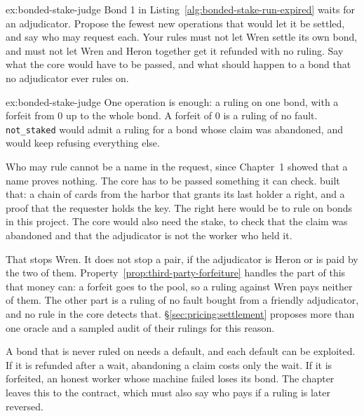 \documentclass[11pt,a4paper]{article}
\theoremstyle{definition}
\theoremstyle{remark}
\begin{document}
\begin{pdexercise}[kind=Open,rating=3]{ex:bonded-stake-judge}
Bond 1 in Listing~\ref{alg:bonded-stake-run-expired} waits for an adjudicator. Propose the fewest new operations that would let it be settled, and say who may request each. Your rules must not let Wren settle its own bond, and must not let Wren and Heron together get it refunded with no ruling. Say what the core would have to be passed, and what should happen to a bond that no adjudicator ever rules on.
\end{pdexercise}
\begin{pdsolution}{ex:bonded-stake-judge}
One operation is enough: a ruling on one bond, with a forfeit from 0 up to the whole bond. A forfeit of 0 is a ruling of no fault. \texttt{not\_staked} would admit a ruling for a bond whose claim was abandoned, and would keep refusing everything else.

Who may rule cannot be a name in the request, since Chapter~1 showed that a name proves nothing. The core has to be passed something it can check.  built that: a chain of cards from the harbor that grants its last holder a right, and a proof that the requester holds the key. The right here would be to rule on bonds in this project. The core would also need the stake, to check that the claim was abandoned and that the adjudicator is not the worker who held it.

That stops Wren. It does not stop a pair, if the adjudicator is Heron or is paid by the two of them. Property~\ref{prop:third-party-forfeiture} handles the part of this that money can: a forfeit goes to the pool, so a ruling against Wren pays neither of them. The other part is a ruling of no fault bought from a friendly adjudicator, and no rule in the core detects that. \S\ref{sec:pricing:settlement} proposes more than one oracle and a sampled audit of their rulings for this reason.

A bond that is never ruled on needs a default, and each default can be exploited. If it is refunded after a wait, abandoning a claim costs only the wait. If it is forfeited, an honest worker whose machine failed loses its bond. The chapter leaves this to the contract, which must also say who pays if a ruling is later reversed.
\end{pdsolution}

\end{document}
